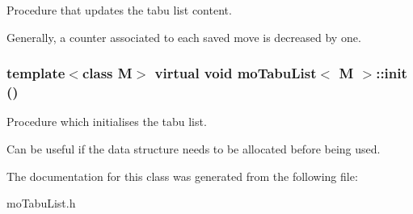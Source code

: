 Procedure that updates the tabu list content. 

Generally, a counter associated to each saved move is decreased by one. 
\subsubsection{\setlength{\rightskip}{0pt plus 5cm}template$<$class M$>$ virtual void {\bf mo\-Tabu\-List}$<$ M $>$::init ()\hspace{0.3cm}{\tt  [pure virtual]}}\label{classmo_tabu_list_0a06c459d56e8e2b408a8f3c6aec4e57}


Procedure which initialises the tabu list. 

Can be useful if the data structure needs to be allocated before being used. 

The documentation for this class was generated from the following file:\begin{CompactItemize}
\item 
mo\-Tabu\-List.h\end{CompactItemize}
